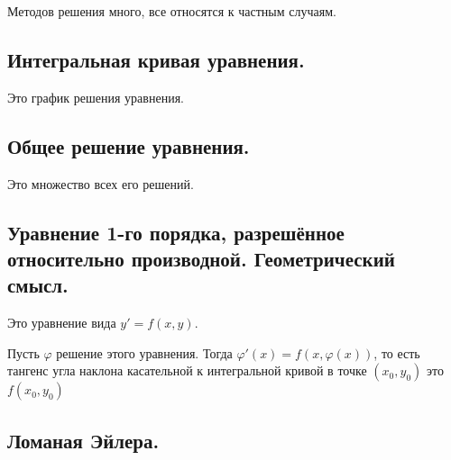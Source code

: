 Методов решения много, все относятся к частным случаям.

\subsection*{Интегральная кривая уравнения.}

Это график решения уравнения.

\subsection*{Общее решение уравнения.}

Это множество всех его решений.

\subsection*{Уравнение 1-го порядка, разрешённое относительно производной. Геометрический смысл.}

Это уравнение вида \(y' = f(x, y)\).

Пусть \(\varphi\) решение этого уравнения. Тогда \(\varphi'(x) = f(x, \varphi(x))\), то есть тангенс угла наклона касательной к интегральной кривой в точке \((x_0, y_0)\) это \(f(x_0, y_0)\)

\subsection*{Ломаная Эйлера.}





